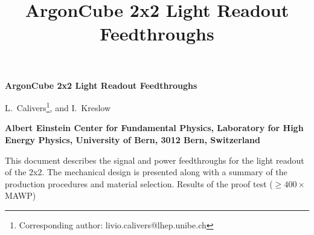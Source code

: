 \documentclass[a4paper]{article}
\title{ArgonCube 2x2 Light Readout Feedthroughs}%
\begin{document}
\begin{center}
	
	{\Large \bf ArgonCube 2x2 Light Readout Feedthroughs} 
	\vspace*{0.5cm}
	\setcounter{footnote}{0}  
	\def\A{\kern+.6ex\lower.42ex\hbox{$\scriptstyle \iota$}\kern-1.20ex a}
	\def\E{\kern+.5ex\lower.42ex\hbox{$\scriptstyle \iota$}\kern-1.10ex e}
	\small
	\newcommand{\Aname}[2]{#1}
	\def\titlefoot#1{\vspace{-0.01cm}\begin{center}{\bf #1}\end{center}}
	
	\Aname{L.~Calivers\footnote{Corresponding author: livio.calivers@lhep.unibe.ch}}{Bern}, and
	\Aname{I.~Kreslow}{Bern}
	\titlefoot{Albert Einstein Center for Fundamental Physics, Laboratory for High Energy Physics, University of Bern, 3012 Bern, Switzerland\label{Bern}}
	
	
\end{center}


This document describes the signal and power feedthroughs for the light readout of the 2x2.
The mechanical design is presented along with a summary of the production procedures and material selection. 
Results of the proof test ($\geq400\times$MAWP)


\printbibliography
\end{document}
